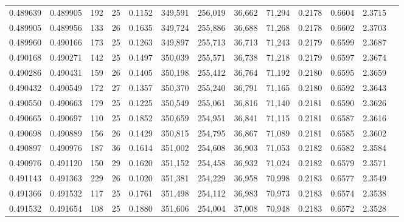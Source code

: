\begin{tabular}{rrrrrrrrrrrrr}
0.489639 & 0.489905 &   192 &  25 &                                     0.1152 & 349,591 & 256,019 &  36,662 &  71,294 & 0.2178 & 0.6604 & 2.3715 \\
0.489905 & 0.489956 &   133 &  26 &                                     0.1635 & 349,724 & 255,886 &  36,688 &  71,268 & 0.2178 & 0.6602 & 2.3703 \\
0.489960 & 0.490166 &   173 &  25 &                                     0.1263 & 349,897 & 255,713 &  36,713 &  71,243 & 0.2179 & 0.6599 & 2.3687 \\
0.490168 & 0.490271 &   142 &  25 &                                     0.1497 & 350,039 & 255,571 &  36,738 &  71,218 & 0.2179 & 0.6597 & 2.3674 \\
0.490286 & 0.490431 &   159 &  26 &                                     0.1405 & 350,198 & 255,412 &  36,764 &  71,192 & 0.2180 & 0.6595 & 2.3659 \\
0.490432 & 0.490549 &   172 &  27 &                                     0.1357 & 350,370 & 255,240 &  36,791 &  71,165 & 0.2180 & 0.6592 & 2.3643 \\
0.490550 & 0.490663 &   179 &  25 &                                     0.1225 & 350,549 & 255,061 &  36,816 &  71,140 & 0.2181 & 0.6590 & 2.3626 \\
0.490665 & 0.490697 &   110 &  25 &                                     0.1852 & 350,659 & 254,951 &  36,841 &  71,115 & 0.2181 & 0.6587 & 2.3616 \\
0.490698 & 0.490889 &   156 &  26 &                                     0.1429 & 350,815 & 254,795 &  36,867 &  71,089 & 0.2181 & 0.6585 & 2.3602 \\
0.490897 & 0.490976 &   187 &  36 &                                     0.1614 & 351,002 & 254,608 &  36,903 &  71,053 & 0.2182 & 0.6582 & 2.3584 \\
0.490976 & 0.491120 &   150 &  29 &                                     0.1620 & 351,152 & 254,458 &  36,932 &  71,024 & 0.2182 & 0.6579 & 2.3571 \\
0.491143 & 0.491363 &   229 &  26 &                                     0.1020 & 351,381 & 254,229 &  36,958 &  70,998 & 0.2183 & 0.6577 & 2.3549 \\
0.491366 & 0.491532 &   117 &  25 &                                     0.1761 & 351,498 & 254,112 &  36,983 &  70,973 & 0.2183 & 0.6574 & 2.3538 \\
0.491532 & 0.491654 &   108 &  25 &                                     0.1880 & 351,606 & 254,004 &  37,008 &  70,948 & 0.2183 & 0.6572 & 2.3528 \\

\end{tabular}
